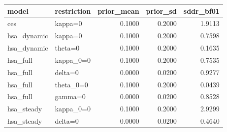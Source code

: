 \begin{tabular}{llrrr}
\toprule
model & restriction & prior\_mean & prior\_sd & sddr\_bf01 \\
\midrule
ces & kappa=0 & 0.1000 & 0.2000 & 1.9113 \\
hsa\_dynamic & kappa=0 & 0.1000 & 0.2000 & 0.7598 \\
hsa\_dynamic & theta=0 & 0.1000 & 0.2000 & 0.1635 \\
hsa\_full & kappa\_0=0 & 0.1000 & 0.2000 & 0.7535 \\
hsa\_full & delta=0 & 0.0000 & 0.0200 & 0.9277 \\
hsa\_full & theta\_0=0 & 0.1000 & 0.2000 & 0.0439 \\
hsa\_full & gamma=0 & 0.0000 & 0.0200 & 0.8528 \\
hsa\_steady & kappa\_0=0 & 0.1000 & 0.2000 & 2.9299 \\
hsa\_steady & delta=0 & 0.0000 & 0.0200 & 0.4640 \\
\bottomrule
\end{tabular}
